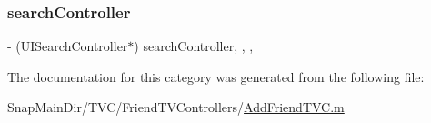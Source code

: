 \subsubsection{\texorpdfstring{search\+Controller}{searchController}}
{\footnotesize\ttfamily -\/ (U\+I\+Search\+Controller$\ast$) search\+Controller\hspace{0.3cm}{\ttfamily [read]}, {\ttfamily [write]}, {\ttfamily [nonatomic]}, {\ttfamily [strong]}}



The documentation for this category was generated from the following file\+:\begin{DoxyCompactItemize}
\item 
Snap\+Main\+Dir/\+T\+V\+C/\+Friend\+T\+V\+Controllers/\hyperlink{_add_friend_t_v_c_8m}{Add\+Friend\+T\+V\+C.\+m}\end{DoxyCompactItemize}

